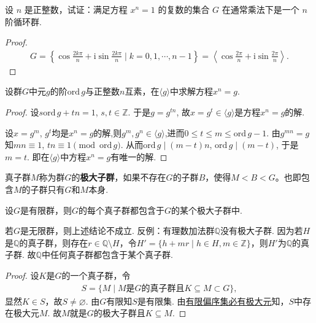 \documentclass[../../main.tex]{subfiles}%
\begin{document}
\begin{example}
设 \( n \) 是正整数，试证：满足方程 \( x^n = 1 \) 的复数的集合 \( G \) 在通常乘法下是一个 \( n \) 阶循环群.
\end{example}
\begin{proof}

\begin{align*}
G = \left\{ \cos \frac{2k\pi}{n} + \mathrm{i} \sin \frac{2k\pi}{n} \mid k = 0, 1, \cdots, n-1 \right\} = \left\langle \cos \frac{2\pi}{n} + \mathrm{i} \sin \frac{2\pi}{n} \right\rangle.
\end{align*}

\end{proof}

\begin{example}
设群$G$中元$g$的阶$\mathrm{ord}\,g$与正整数$n$互素，在$\langle g\rangle$中求解方程$x^n = g$.
\end{example}
\begin{proof}

设$s \mathrm{ord}\,g + t n = 1$, $s,t\in\mathbb{Z}$. 于是$g = g^{t n}$, 故$x = g^t \in \langle g\rangle$是方程$x^n = g$的解.

设$x = g^m$, $g^t$均是$x^n = g$的解,则$g^m,g^n\in \langle g\rangle$,进而$0\leqslant t\leqslant m\leqslant \mathrm{ord}\,g-1$. 由$g^{m n} = g$知$m n \equiv 1$, $t n \equiv 1 \pmod{\mathrm{ord}\,g}$. 从而$\mathrm{ord}\,g\mid (m-t)n$, $\mathrm{ord}\,g\mid (m-t)$, 于是$m = t$. 即在$\langle g\rangle$中方程$x^n = g$有唯一的解.

\end{proof}

\begin{definition}[极大子群]
真子群$M$称为群$G$的\textbf{极大子群}，如果不存在$G$的子群$B$，使得$M < B < G$。也即包含$M$的子群只有$G$和$M$本身.
\end{definition}

\begin{theorem}\label{theorem:有限群的每个真子群必包含于某个极大子群中}
设$G$是有限群，则$G$的每个真子群都包含于$G$的某个极大子群中.
\end{theorem}
\begin{remark}
若$G$是无限群，则上述结论不成立. 反例：有理数加法群$\mathbb{Q}$没有极大子群.
因为若$H$是$\mathbb{Q}$的真子群，则存在$r\in\mathbb{Q}\setminus H$，令$H'=\{ h+mr\mid h\in H,m\in\mathbb{Z} \}$，则$H'$为$\mathbb{Q}$的真子群. 故$\mathbb{Q}$中任何真子群都包含于某个真子群.
\end{remark}
\begin{proof}

设$K$是$G$的一个真子群，令
\begin{align*}
S=\{ M\mid M\text{是}G\text{的真子群且}K\subseteq M\subset G \},
\end{align*}
显然$K\in S$，故$S\neq\varnothing$. 由$G$有限知$S$是有限集. 由\hyperref[Set Theorem-theorem:有限偏序集必有极大元]{有限偏序集必有极大元}知，$S$中存在极大元$M$. 故$M$就是$G$的极大子群且$K\subseteq M$.

\end{proof}
\end{document}
